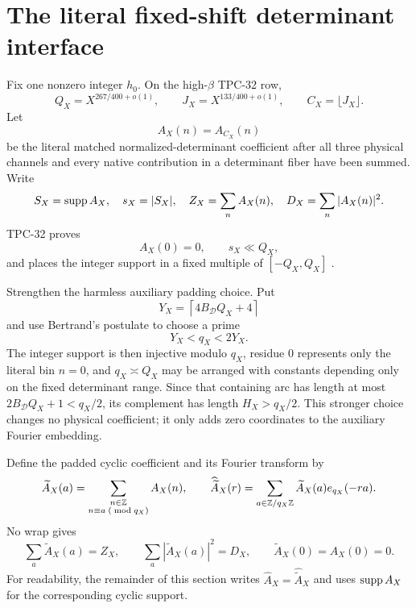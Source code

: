 \section{The literal fixed-shift determinant interface}
\label{sec:physical-interface}

Fix one nonzero integer \(h_0\).  On the high-\(\beta\) TPC-32 row,
\begin{equation}
 Q_X=X^{267/400+o(1)},\qquad
 J_X=X^{133/400+o(1)},\qquad
 C_X=\lfloor J_X\rfloor.
\label{eq:critical-scales}
\end{equation}
Let
\[
 A_X(n)=A_{C_X}(n)
\]
be the literal matched normalized-determinant coefficient after all
three physical channels and every native contribution in a
determinant fiber have been summed.  Write
\[
 S_X=\operatorname{supp} A_X,\quad s_X=|S_X|,\quad
 Z_X=\sum_nA_X(n),\quad D_X=\sum_n|A_X(n)|^2.
\]
TPC-32 proves
\begin{equation}
 A_X(0)=0,\qquad s_X\ll Q_X,
\label{eq:physical-zero-support}
\end{equation}
and places the integer support in a fixed multiple of
\([-Q_X,Q_X]\) \citep{WangTPC32}.

Strengthen the harmless auxiliary padding choice.  Put
\[
 Y_X=\left\lceil4B_{\mathcal D}Q_X+4\right\rceil
\]
and use Bertrand's postulate to choose a prime
\begin{equation}
 Y_X<q_X<2Y_X.
\label{eq:physical-modulus}
\end{equation}
The integer support is then injective modulo \(q_X\), residue \(0\)
represents only the literal bin \(n=0\), and \(q_X\asymp Q_X\) may be
arranged with constants depending only on the fixed determinant
range.  Since that containing arc has length at most
\(2B_{\mathcal D}Q_X+1<q_X/2\), its complement has length
\(H_X>q_X/2\).  This stronger choice changes no physical coefficient;
it only adds zero coordinates to the auxiliary Fourier embedding.

Define the padded cyclic coefficient and its Fourier transform by
\begin{equation}
 \widetilde A_X(a)
 =
 \sum_{\substack{n\in\mathbb Z\\n\equiv a\;(\bmod q_X)}}A_X(n),
 \qquad
 \widehat{\widetilde A}_X(r)
 =
 \sum_{a\in\mathbb Z/q_X\mathbb Z}\widetilde A_X(a)e_{q_X}(-ra).
\label{eq:padded-cyclic-coefficient}
\end{equation}
No wrap gives
\begin{equation}
 \sum_a\widetilde A_X(a)=Z_X,\qquad
 \sum_a|\widetilde A_X(a)|^2=D_X,\qquad
 \widetilde A_X(0)=A_X(0)=0.
\label{eq:no-wrap-identities}
\end{equation}
For readability, the remainder of this section writes
\(\widehat A_X=\widehat{\widetilde A}_X\) and uses
\(\operatorname{supp} A_X\) for the corresponding cyclic support.

